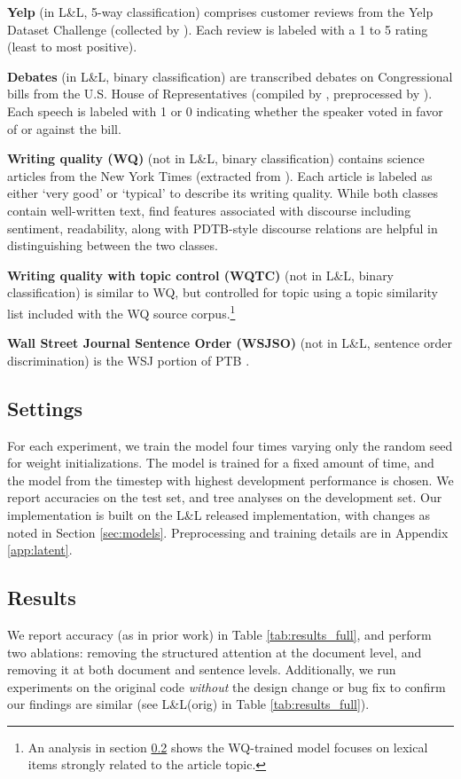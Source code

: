 \smallskip
\noindent\textbf{Yelp} (in L\&L, 5-way classification) comprises customer reviews from the Yelp Dataset Challenge
(collected by \citet{Tang:2015}). Each review is labeled with a 1 to 5 rating (least to most positive).

\smallskip
\noindent\textbf{Debates} (in L\&L, binary classification) are transcribed debates on Congressional bills from the U.S. House of Representatives (compiled by \citet{Thomas:2006}, preprocessed by \citet{Yogatama:2014}). Each speech is labeled with 1 or 0 indicating whether the speaker voted in favor of or against the bill.   

\smallskip
\noindent\textbf{Writing quality (WQ)} (not in L\&L, binary classification) contains science articles from the New York Times (extracted from \citet{Louis:2013}). Each article is labeled as either `very good' or `typical' to describe its writing quality. While both classes contain  well-written text, \citet{Louis:2013} find features associated with discourse including
sentiment, readability, along with PDTB-style discourse relations are helpful in distinguishing between the two classes.

\smallskip
\noindent\textbf{Writing quality with topic control (WQTC)} (not in L\&L, binary classification) is similar to \textsc{WQ}, but controlled for topic using a topic similarity list included with the \textsc{WQ} source corpus.\footnote{An analysis in section \ref{sec:results} shows the \textsc{WQ}-trained model focuses on lexical items strongly related to the article topic.}  

\smallskip
\noindent\textbf{Wall Street Journal Sentence Order (WSJSO)} (not in L\&L, sentence order discrimination) is the WSJ portion of PTB \cite{Marcus:1993}.

\subsection{Settings}
For each experiment, we train the model four times varying only the random seed for weight initializations. The model is trained for a fixed amount of time, and the model from the timestep with highest development performance is chosen. We report accuracies on the test set, and tree analyses on the development set. Our implementation is built on the L\&L released implementation, with changes as noted in Section \ref{sec:models}. Preprocessing and training details are in Appendix \ref{app:latent}.


\subsection{Results}
\label{sec:results}
We report accuracy (as in prior work) in Table \ref{tab:results_full}, and perform two ablations: removing the structured attention at the document level, and removing it at both document and sentence levels. Additionally, we run experiments on the original code \emph{without} the design change or bug fix to confirm our findings are similar (see L\&L(orig) in Table \ref{tab:results_full}).

